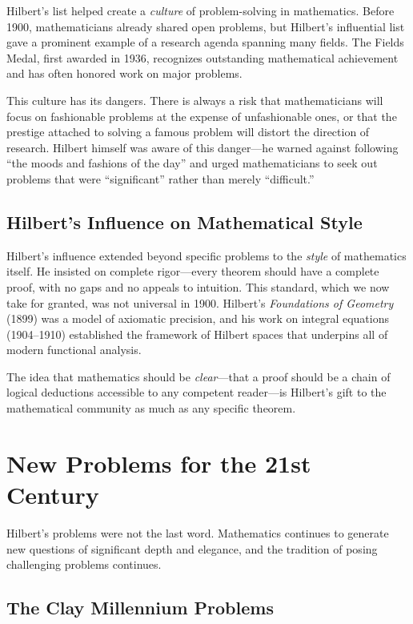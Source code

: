 Hilbert's list helped create a \emph{culture} of problem-solving in mathematics. Before 1900, mathematicians already shared open problems, but Hilbert's influential list gave a prominent example of a research agenda spanning many fields. The Fields Medal, first awarded in 1936, recognizes outstanding mathematical achievement and has often honored work on major problems.

This culture has its dangers. There is always a risk that mathematicians will focus on fashionable problems at the expense of unfashionable ones, or that the prestige attached to solving a famous problem will distort the direction of research. Hilbert himself was aware of this danger---he warned against following ``the moods and fashions of the day'' and urged mathematicians to seek out problems that were ``significant'' rather than merely ``difficult.''

\subsection{Hilbert's Influence on Mathematical Style}

Hilbert's influence extended beyond specific problems to the \emph{style} of mathematics itself. He insisted on complete rigor---every theorem should have a complete proof, with no gaps and no appeals to intuition. This standard, which we now take for granted, was not universal in 1900. Hilbert's \emph{Foundations of Geometry} (1899) was a model of axiomatic precision, and his work on integral equations (1904--1910) established the framework of Hilbert spaces that underpins all of modern functional analysis.

The idea that mathematics should be \emph{clear}---that a proof should be a chain of logical deductions accessible to any competent reader---is Hilbert's gift to the mathematical community as much as any specific theorem.

\section{New Problems for the 21st Century}

Hilbert's problems were not the last word. Mathematics continues to generate new questions of significant depth and elegance, and the tradition of posing challenging problems continues.

\subsection{The Clay Millennium Problems}

